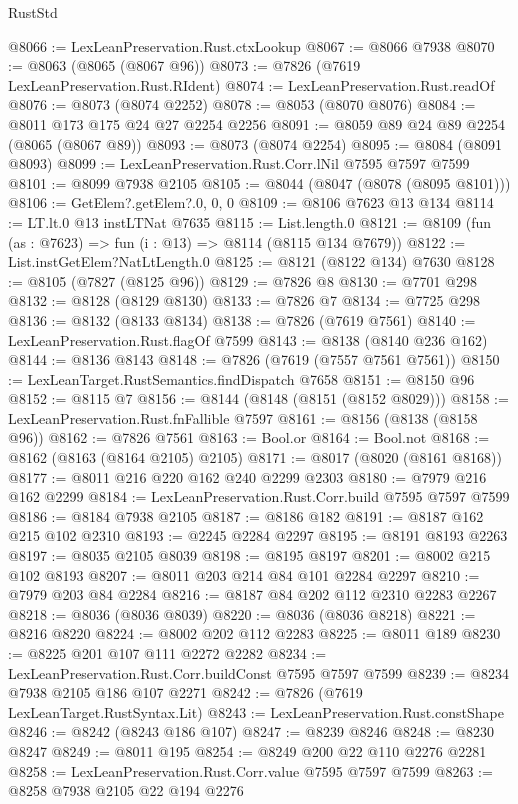 \begin{lexlean}{RustStd}
\begin{coremodule}
@8066 := LexLeanPreservation.Rust.ctxLookup
@8067 := @8066 @7938
@8070 := @8063 (@8065 (@8067 @96))
@8073 := @7826 (@7619 LexLeanPreservation.Rust.RIdent)
@8074 := LexLeanPreservation.Rust.readOf
@8076 := @8073 (@8074 @2252)
@8078 := @8053 (@8070 @8076)
@8084 := @8011 @173 @175 @24 @27 @2254 @2256
@8091 := @8059 @89 @24 @89 @2254 (@8065 (@8067 @89))
@8093 := @8073 (@8074 @2254)
@8095 := @8084 (@8091 @8093)
@8099 := LexLeanPreservation.Rust.Corr.lNil @7595 @7597 @7599
@8101 := @8099 @7938 @2105
@8105 := @8044 (@8047 (@8078 (@8095 @8101)))
@8106 := GetElem?.getElem?.{0, 0, 0}
@8109 := @8106 @7623 @13 @134
@8114 := LT.lt.{0} @13 instLTNat @7635
@8115 := List.length.{0}
@8121 := @8109 (fun (as : @7623) => fun (i : @13) => @8114 (@8115 @134 @7679))
@8122 := List.instGetElem?NatLtLength.{0}
@8125 := @8121 (@8122 @134) @7630
@8128 := @8105 (@7827 (@8125 @96))
@8129 := @7826 @8
@8130 := @7701 @298
@8132 := @8128 (@8129 @8130)
@8133 := @7826 @7
@8134 := @7725 @298
@8136 := @8132 (@8133 @8134)
@8138 := @7826 (@7619 @7561)
@8140 := LexLeanPreservation.Rust.flagOf @7599
@8143 := @8138 (@8140 @236 @162)
@8144 := @8136 @8143
@8148 := @7826 (@7619 (@7557 @7561 @7561))
@8150 := LexLeanTarget.RustSemantics.findDispatch @7658
@8151 := @8150 @96
@8152 := @8115 @7
@8156 := @8144 (@8148 (@8151 (@8152 @8029)))
@8158 := LexLeanPreservation.Rust.fnFallible @7597
@8161 := @8156 (@8138 (@8158 @96))
@8162 := @7826 @7561
@8163 := Bool.or
@8164 := Bool.not
@8168 := @8162 (@8163 (@8164 @2105) @2105)
@8171 := @8017 (@8020 (@8161 @8168))
@8177 := @8011 @216 @220 @162 @240 @2299 @2303
@8180 := @7979 @216 @162 @2299
@8184 := LexLeanPreservation.Rust.Corr.build @7595 @7597 @7599
@8186 := @8184 @7938 @2105
@8187 := @8186 @182
@8191 := @8187 @162 @215 @102 @2310
@8193 := @2245 @2284 @2297
@8195 := @8191 @8193 @2263
@8197 := @8035 @2105 @8039
@8198 := @8195 @8197
@8201 := @8002 @215 @102 @8193
@8207 := @8011 @203 @214 @84 @101 @2284 @2297
@8210 := @7979 @203 @84 @2284
@8216 := @8187 @84 @202 @112 @2310 @2283 @2267
@8218 := @8036 (@8036 @8039)
@8220 := @8036 (@8036 @8218)
@8221 := @8216 @8220
@8224 := @8002 @202 @112 @2283
@8225 := @8011 @189
@8230 := @8225 @201 @107 @111 @2272 @2282
@8234 := LexLeanPreservation.Rust.Corr.buildConst @7595 @7597 @7599
@8239 := @8234 @7938 @2105 @186 @107 @2271
@8242 := @7826 (@7619 LexLeanTarget.RustSyntax.Lit)
@8243 := LexLeanPreservation.Rust.constShape
@8246 := @8242 (@8243 @186 @107)
@8247 := @8239 @8246
@8248 := @8230 @8247
@8249 := @8011 @195
@8254 := @8249 @200 @22 @110 @2276 @2281
@8258 := LexLeanPreservation.Rust.Corr.value @7595 @7597 @7599
@8263 := @8258 @7938 @2105 @22 @194 @2276

\end{coremodule}
\end{lexlean}
